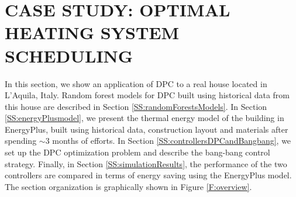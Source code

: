 \section{CASE STUDY: OPTIMAL HEATING SYSTEM SCHEDULING}
\label{S:realCaseStudy}

In this section, we show an application of DPC to a real house located in L'Aquila, Italy. Random forest models for DPC built using historical data from this house are described in Section \ref{SS:randomForestsModels}. 
In Section \ref{SS:energyPlusmodel}, we present the thermal energy model of the building in EnergyPlus, built using historical data, construction layout and materials after spending $\sim3$ months of efforts.
In Section \ref{SS:controllersDPCandBangbang}, we set up the DPC optimization problem and describe the bang-bang control strategy. Finally, in Section \ref{SS:simulationResults}, the performance of the two controllers are compared in terms of energy saving using the EnergyPlus model. The section organization is graphically shown in Figure \ref{F:overview}.

